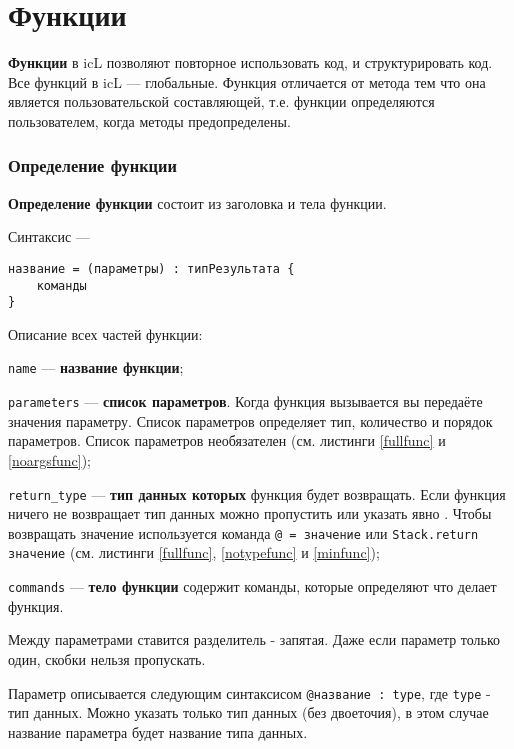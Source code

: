 \section{Функции}

{\bf Функции} в icL позволяют повторное использовать код, и структурировать код. Все функций в icL — глобальные. Функция отличается от метода тем что она является пользовательской составляющей, т.е. функции определяются пользователем, когда методы предопределены.

\subsubsection{Определение функции}

{\bf Определение функции} состоит из заголовка и тела функции.

\noindent Синтаксис —
\begin{verbatim}
название = (параметры) : типРезультата {
	команды
}
\end{verbatim}

Описание всех частей функции:
\begin{icItems}
\item
	\texttt{name} — {\bf название функции};
\item
	\texttt{parameters} — {\bf список параметров}. Когда функция вызывается вы передаёте значения параметру. Список параметров определяет тип, количество и порядок параметров. Список параметров необязателен (см. листинги \ref{fullfunc} и \ref{noargsfunc});
\item
	\texttt{return_type} — {\bf тип данных которых} функция будет возвращать. Если функция ничего не возвращает тип данных можно пропустить или указать явно \void{}. Чтобы возвращать значение используется команда \texttt{@ = значение} или \texttt{Stack.return значение} (см. листинги \ref{fullfunc}, \ref{notypefunc} и \ref{minfunc});
\item
	\texttt{commands} — {\bf тело функции} содержит команды, которые определяют что делает функция.
\end{icItems}

Между параметрами ставится разделитель - запятая. Даже если параметр только один, скобки нельзя пропускать.

Параметр описывается следующим синтаксисом \texttt{@название : type}, где \texttt{type} - тип данных. Можно указать только тип данных (без двоеточия), в этом случае название параметра будет название типа данных.

